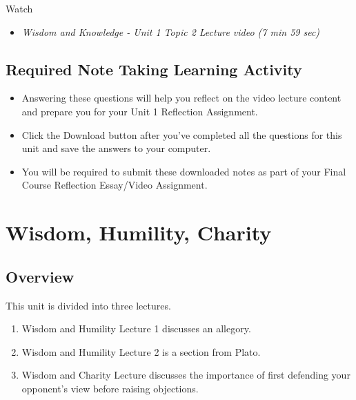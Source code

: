 \documentclass[
]{book}
\providecommand{\tightlist}{%
  \setlength{\itemsep}{0pt}\setlength{\parskip}{0pt}}
\begin{document}
Watch

\begin{itemize}
\tightlist
\item
  \emph{Wisdom and Knowledge - Unit 1 Topic 2 Lecture video (7 min 59 sec)}
\end{itemize}

\hypertarget{required-note-taking-learning-activity}{%
\section*{Required Note Taking Learning Activity}\label{required-note-taking-learning-activity}}

\begin{itemize}
\tightlist
\item
  Answering these questions will help you reflect on the video lecture content and prepare you for your Unit 1 Reflection Assignment.
\item
  Click the Download button after you've completed all the questions for this unit and save the answers to your computer.
\item
  You will be required to submit these downloaded notes as part of your Final Course Reflection Essay/Video Assignment.
\end{itemize}

\hypertarget{wisdom-humility-charity}{%
\chapter{Wisdom, Humility, Charity}\label{wisdom-humility-charity}}

\hypertarget{overview-1}{%
\section*{Overview}\label{overview-1}}

This unit is divided into three lectures.

\begin{enumerate}
\def\labelenumi{\arabic{enumi}.}
\tightlist
\item
  Wisdom and Humility Lecture 1 discusses an allegory.
\item
  Wisdom and Humility Lecture 2 is a section from Plato.
\item
  Wisdom and Charity Lecture discusses the importance of first defending your opponent's view before raising objections.
\end{enumerate}
\end{document}
